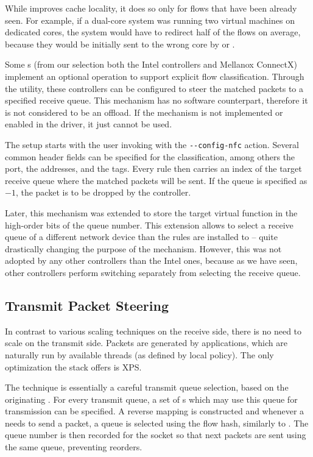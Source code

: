 While  improves cache locality, it does so only for flows that have
been already seen. For example, if a dual-core system was running two virtual
machines on dedicated  cores, the
system would have to redirect half of the flows on average, because they would
be initially sent to the wrong  core by  or .

Some s (from our selection both the Intel controllers and Mellanox ConnectX)
implement an optional  operation to support explicit flow
classification. Through the  utility, these controllers can be
configured to steer the matched packets to a specified receive queue. This mechanism
has no software counterpart, therefore it is not considered to be an offload.
If the mechanism is not implemented or enabled in the  driver, it just
cannot be used.

The setup starts with the user invoking  with the \Verb|--config-nfc|
action. Several common header fields can be specified for the
classification, among others the  port, the  addresses, and the  tags.
Every rule then carries an index of the target receive queue where the matched
packets will be sent. If the queue is specified as $-1$, the packet is to be dropped by the
controller.

Later, this mechanism was extended to store the target virtual function in the
high-order bits of the queue number. This extension allows to select a receive
queue of a different network device than the rules are installed to -- quite
drastically changing the purpose of the mechanism. However, this was not
adopted by any other controllers than the Intel ones, because as we have seen, other
controllers perform switching separately from selecting the receive queue.

\subsection{Transmit Packet Steering}

In contrast to various scaling techniques on the receive side, there is no need
to scale on the transmit side. Packets are generated by applications, which are
naturally run by available  threads (as defined by local policy). The
only optimization the stack offers is \acrfull{XPS}.

The technique is essentially a careful transmit queue selection, based on the
originating . For every transmit queue, a set of s which may use
this queue for transmission can be specified. A reverse mapping is constructed
and whenever a  needs to send a packet, a queue is selected
using the flow hash, similarly to . The queue number is
then recorded for the socket so that next packets are sent using the same
queue, preventing reorders.

